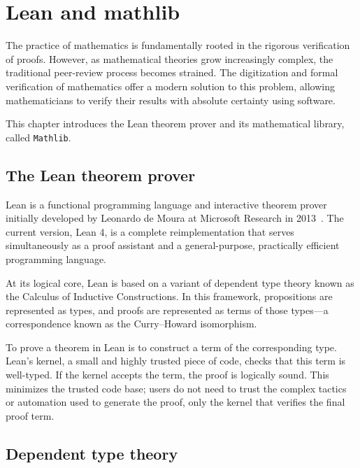 \chapter{Lean and mathlib}
\label{chap:introduction}

The practice of mathematics is fundamentally rooted in the rigorous verification of proofs.
However, as mathematical theories grow increasingly complex, the traditional peer-review process
becomes strained. The digitization and formal verification of mathematics offer a modern solution
to this problem, allowing mathematicians to verify their results with absolute certainty using
software.

This chapter introduces the Lean theorem prover and its mathematical library,
called \lstinline|Mathlib|.

\section{The Lean theorem prover}
\label{sec:lean_theorem_prover}

Lean is a functional programming language and interactive theorem prover initially developed
by Leonardo de Moura at Microsoft Research in 2013~\cite{demoura2015lean}.
The current version, Lean 4,
is a complete reimplementation that serves simultaneously as a proof assistant and a
general-purpose, practically efficient programming language.

At its logical core, Lean is based on a variant of dependent type theory known as the
Calculus of Inductive Constructions. In this framework, propositions are represented
as types, and proofs are represented as terms of those types—a correspondence known as the
Curry--Howard isomorphism.

To prove a theorem in Lean is to construct a term of the corresponding type. Lean's kernel,
a small and highly trusted piece of code, checks that this term is well-typed. If the kernel
accepts the term, the proof is logically sound. This minimizes the trusted code base; users
do not need to trust the complex tactics or automation used to generate the proof, only the
kernel that verifies the final proof term.


\section{Dependent type theory}
\label{sec:dependent_type_theory}

